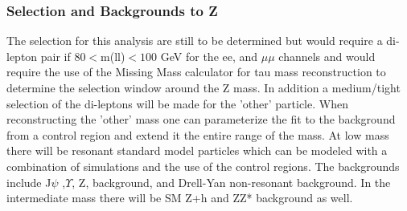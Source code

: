 
\subsubsection{Selection and Backgrounds to Z }
\label{sec:zscanback}
The selection for this analysis are still to be determined but would require a di-lepton pair if  $80<$m(ll)$<100$ GeV for the ee, and $\mu\mu$ channels and would require the use of the Missing Mass calculator for tau mass
reconstruction to determine the selection window around the Z mass.  In addition a medium/tight selection of the di-leptons will be made for the 'other' particle. 
When reconstructing the 'other' mass one can parameterize the fit to the background from a control region and extend it the entire range of the mass.  At low mass there will be resonant standard model particles which can be modeled with a combination of simulations and the use of the control regions.
The backgrounds include J$\psi$ ,$\Upsilon$, Z, \ttbar background, and Drell-Yan non-resonant background. In the intermediate mass there will be SM Z+h and ZZ* background as well.



